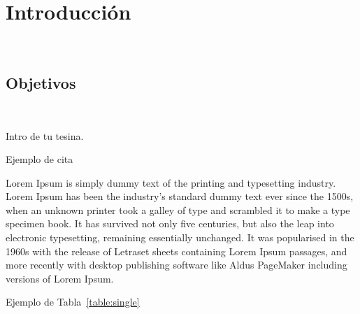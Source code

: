 \chapter{Introducción}
~\label{cap:intro}

\section{Objetivos}
~\label{cap:intro:sec:obj}

Intro de tu tesina.

Ejemplo de cita~\cite{esp:blast2}

Lorem Ipsum is simply dummy text of the printing and typesetting industry.
Lorem Ipsum has been the industry's standard dummy text ever since the 1500s,
when an unknown printer took a galley of type and scrambled it to make a type
specimen book. It has survived not only five centuries, but also the leap into
electronic typesetting, remaining essentially unchanged. It was popularised in
the 1960s with the release of Letraset sheets containing Lorem Ipsum passages,
and more recently with desktop publishing software like Aldus PageMaker
including versions of Lorem Ipsum.



Ejemplo de Tabla~\ref{table:single}
